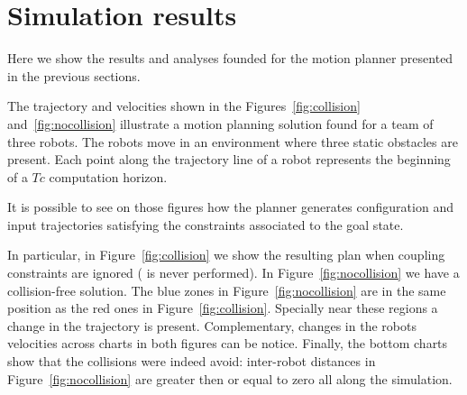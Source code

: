 \documentclass[eprint]{actapoly}
\begin{document}







\section{Simulation results}




Here we show the results and analyses founded for the motion planner presented
in the previous sections.

The trajectory and velocities shown in the Figures~\ref{fig:collision} and~\ref{fig:nocollision}
illustrate a motion planning solution found for a team of three robots.
The robots move in an environment where three static obstacles are present.
Each point along the trajectory line of a robot represents the beginning
of a $Tc$ computation horizon.

It is possible to see on those figures how the planner generates configuration and 
input trajectories satisfying the constraints associated to the goal state.

In particular, in Figure~\ref{fig:collision} we show the resulting plan when 
coupling constraints
are ignored ( is never performed). In Figure~\ref{fig:nocollision}
we have a collision-free solution. The blue zones in Figure~\ref{fig:nocollision} 
are in the same position as the red ones in Figure~\ref{fig:collision}. Specially 
near these regions a change in the trajectory is present. Complementary, changes 
in the robots velocities across charts in both figures can be notice. Finally, the 
bottom charts show that the collisions were indeed avoid: inter-robot distances in 
Figure~\ref{fig:nocollision} are greater then or equal to zero all along the 
simulation.
\end{document}
